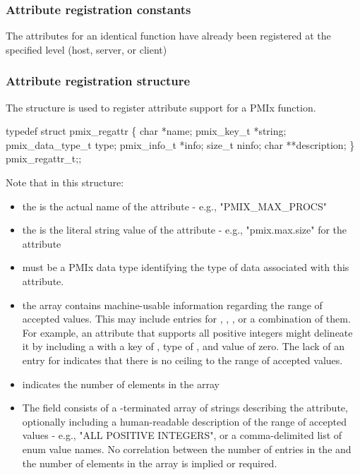 \subsubsection{Attribute registration constants}

\begin{constantdesc}

%
The attributes for an identical function have already been registered at the specified level (host, server, or client)

\end{constantdesc}

\subsubsection{Attribute registration structure}

The  structure is used to register attribute support for a \ac{PMIx} function.

\cspecificstart
\begin{codepar}
typedef struct pmix_regattr \{
    char *name;
    pmix_key_t *string;
    pmix_data_type_t type;
    pmix_info_t *info;
    size_t ninfo;
    char **description;
\} pmix_regattr_t;;
\end{codepar}
\cspecificend

Note that in this structure:

\begin{itemize}
    \item the  is the actual name of the attribute - e.g., "PMIX_MAX_PROCS"
    \item the  is the literal string value of the attribute - e.g., "pmix.max.size" for the  attribute
    \item {} must be a \ac{PMIx} data type identifying the type of data associated with this attribute.
    \item the  array contains machine-usable information regarding the range of accepted values. This may include entries for , , , or a combination of them. For example, an attribute that supports all positive integers might delineate it by including a  with a key of , type of , and value of zero. The lack of an entry for  indicates that there is no ceiling to the range of accepted values.
    \item {} indicates the number of elements in the  array
    \item The  field consists of a -terminated array of strings describing the attribute, optionally including a human-readable description of the range of accepted values - e.g., "ALL POSITIVE INTEGERS", or a comma-delimited list of enum value names. No correlation between the number of entries in the  and the number of elements in the  array is implied or required.
\end{itemize}

